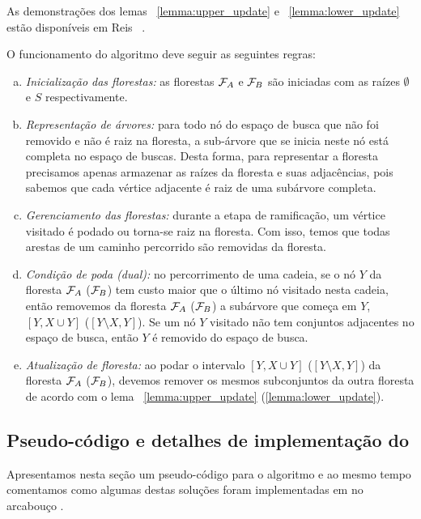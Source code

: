 As demonstrações dos lemas ~\ref{lemma:upper_update} e 
~\ref{lemma:lower_update} estão disponíveis em Reis ~\cite{Rei12}.

O funcionamento do algoritmo deve seguir as seguintes regras:
\begin{enumerate}[a)]
    \item{\it Inicialização das florestas:} as florestas $\mathcal{F}_A$ e 
        $\mathcal{F}_B$ são iniciadas com as raízes $\emptyset$ e $S$ 
        respectivamente. \label{pfs:rule:a}
    \item{\it Representação de árvores:} para todo nó do espaço de busca 
        que não foi removido e não é raiz na floresta, a sub-árvore que
        se inicia neste nó está completa no espaço de buscas. Desta 
        forma, para representar a floresta precisamos apenas armazenar
        as raízes da floresta e suas adjacências, pois sabemos que cada
        vértice adjacente é raiz de uma subárvore completa. 
        \label{pfs:rule:b}
    \item{\it Gerenciamento das florestas:} durante a etapa de 
        ramificação, um vértice visitado é podado ou torna-se raiz na 
        floresta. Com isso, temos que todas arestas de um caminho 
        percorrido são removidas da floresta. \label{pfs:rule:c}
    \item{\it Condição de poda (dual):} no percorrimento de uma cadeia,
        se o nó $Y$ da floresta $\mathcal{F}_A$ ($\mathcal{F}_B$) tem custo 
        maior que o último nó visitado nesta cadeia, então removemos da
        floresta $\mathcal{F}_A$ ($\mathcal{F}_B$) a subárvore que
        começa em $Y$, $[Y, X \cup Y]$ ($[Y \setminus X, Y]$). Se um nó
        $Y$ visitado não tem conjuntos adjacentes no espaço de busca, 
        então $Y$ é removido do espaço de busca.
        \label{pfs:rule:d}
    \item{\it Atualização de floresta:} ao podar o intervalo 
        $[Y, X \cup Y]$ ($[Y \setminus X, Y]$) da floresta $\mathcal{F}_A$
        ($\mathcal{F}_B$), devemos remover os mesmos subconjuntos da outra
        floresta de acordo com o lema ~\ref{lemma:upper_update}
        (\ref{lemma:lower_update}). \label{pfs:rule:e}
\end{enumerate}


\subsection{Pseudo-código e detalhes de implementação do }
Apresentamos nesta seção um pseudo-código para o algoritmo e ao mesmo
tempo comentamos como algumas destas soluções foram implementadas em  no arcabouço .

